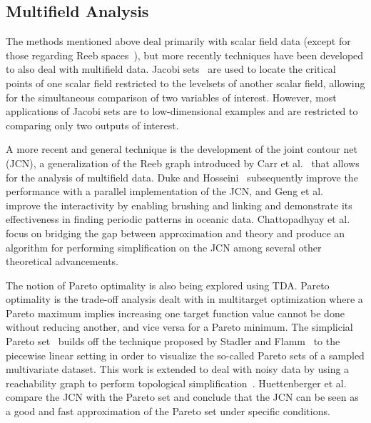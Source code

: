 \subsection{Multifield Analysis}

The methods mentioned above deal primarily with scalar field data (except for those regarding Reeb spaces~\cite{MunchWang2016,CarrGengTierny2015,KlacanskyTiernyCarr2016,TiernyCarr2016}), but more recently techniques have been developed to also deal with multifield data.
%
Jacobi sets~\cite{EdelsbrunnerHarer2002} are used to locate the critical points of one scalar field restricted to the levelsets of another scalar field, allowing for the simultaneous comparison of two variables of interest.
%
However, most applications of Jacobi sets are to low-dimensional examples and are restricted to comparing only two outputs of interest.

A more recent and general technique is the development of the joint contour net (JCN), a generalization of the Reeb graph introduced by Carr et al.~\cite{CarrDuke2014,DukeCarrKnoll2012} that allows for the analysis of multifield data.
%
Duke and Hosseini~\cite{DukeHosseini2015} subsequently improve the performance with a parallel implementation of the JCN, and Geng et al.~\cite{GengDukeCarr2015} improve the interactivity by enabling brushing and linking and demonstrate its effectiveness in finding periodic patterns in oceanic data.
%
Chattopadhyay et al.~\cite{ChattopadhyayCarrDuke2014,ChattopadhyayCarrDuke2016} focus on bridging the gap between approximation and theory and produce an algorithm for performing simplification on the JCN among several other theoretical advancements.

The notion of Pareto optimality is also being explored using TDA.
%
Pareto optimality is the trade-off analysis dealt with in multitarget optimization where a Pareto maximum implies increasing one target function value cannot be done without reducing another, and vice versa for a Pareto minimum.
%
The simplicial Pareto set~\cite{HuettenbergerHeineCarr2013} builds off the technique proposed by Stadler and Flamm~\cite{StadlerFlamm2003} to the piecewise linear setting in order to visualize the so-called Pareto sets of a sampled multivariate dataset.
%
This work is extended to deal with noisy data by using a reachability graph to perform topological simplification~\cite{HuettenbergerHeineGarth2014}.
%
Huettenberger et al.~\cite{HuettenbergerHeineGarth2015} compare the JCN with the Pareto set and conclude that the JCN can be seen as a good and fast approximation of the Pareto set under specific conditions.

